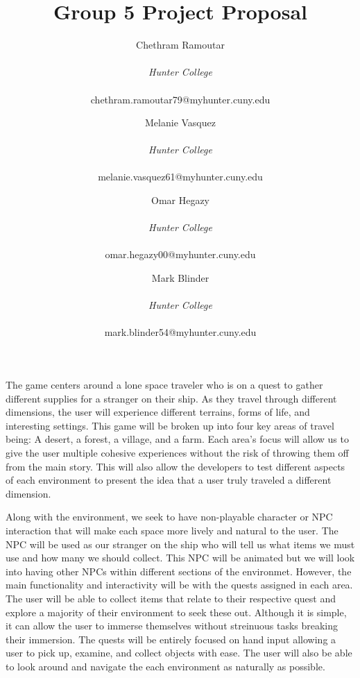 \documentclass{vgtc}                          %
\title{Group 5 Project Proposal}
\author{Chethram Ramoutar\\ %
    \parbox{1.4in}{\scriptsize  \centering\emph{Hunter College}}\\
    \scriptsize{chethram.ramoutar79@myhunter.cuny.edu}
\and Melanie Vasquez\\ %
    \parbox{1.4in}{\scriptsize \centering\emph{Hunter College}}\\
    \scriptsize{melanie.vasquez61@myhunter.cuny.edu}
\and Omar Hegazy\\ %
    \parbox{1.4in}{\scriptsize  \centering\emph{Hunter College}}\\
    \scriptsize{omar.hegazy00@myhunter.cuny.edu}\\
\and Mark Blinder\\ %
    \parbox{1.4in}{\scriptsize  \centering\emph{Hunter College}}\\
    \scriptsize{mark.blinder54@myhunter.cuny.edu}}
\begin{document}
\maketitle



The game centers around a lone space traveler who is on a quest to gather different supplies for a stranger on their ship. As they travel through
different dimensions, the user will experience different terrains, forms of life, and interesting settings. This game will be broken up into four key
areas of travel being: A desert, a forest, a village, and a farm. Each area's focus will allow us to give the user multiple cohesive experiences without
the risk of throwing them off from the main story. This will also allow the developers to test different aspects of each environment to present the idea that
a user truly traveled a different dimension.

Along with the environment, we seek to have non-playable character or NPC interaction that will make each space more lively and natural to the user. The NPC will be used as our stranger on the ship who will tell us what items
we must use and how many we should collect. This NPC will be animated but we will look into having other NPCs within different sections of the environmet. However, the main
functionality and interactivity will be with the quests assigned in each area. The user will be able to collect items that relate to their respective quest and explore a majority
of their environment to seek these out. Although it is simple, it can allow the user to immerse themselves without streinuous tasks breaking their immersion. The quests will be entirely focused on
hand input allowing a user to pick up, examine, and collect objects with ease. The user will also be able to look around and navigate the each environment as naturally as possible.
\end{document}
